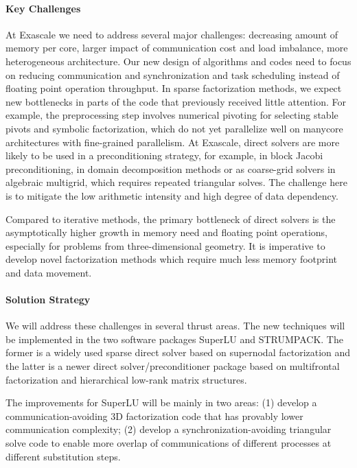 \paragraph{Key Challenges}
At Exascale we need to address several major challenges:
decreasing amount of memory per core, larger impact of communication
cost and load imbalance, more heterogeneous architecture.
Our new design of algorithms and codes need to focus on
reducing communication and synchronization and task scheduling 
instead of floating point operation throughput. In sparse factorization
methods, we expect new bottlenecks in parts of the code
that previously received little attention. For example, the preprocessing
step involves numerical pivoting for selecting stable pivots and
symbolic factorization, which do not yet parallelize well on manycore
architectures with fine-grained parallelism.
At Exascale, direct solvers are more likely to
be used in a preconditioning strategy, for example, in block Jacobi
preconditioning, in domain decomposition methods or as coarse-grid
solvers in algebraic multigrid, which requires repeated triangular
solves. The challenge here is to mitigate the low arithmetic intensity
and high degree of data dependency.

Compared to iterative methods, the primary bottleneck of direct solvers
is the asymptotically higher growth in memory need and floating point
operations, especially for problems from three-dimensional geometry.
It is imperative to develop novel factorization methods which require
much less memory footprint and data movement.


\paragraph{Solution Strategy}
We will address these challenges in several thrust areas.
The new techniques will be implemented in the two software packages SuperLU
and STRUMPACK. The former is a widely used sparse direct solver based on
supernodal factorization and the latter is a newer direct
solver/preconditioner package based on multifrontal factorization 
and hierarchical low-rank matrix structures.

The improvements for SuperLU will be mainly in two areas: (1) develop
a communication-avoiding 3D factorization code that has provably 
lower communication complexity; (2) develop a synchronization-avoiding
triangular solve code to enable more overlap of communications of different
processes at different substitution steps.

